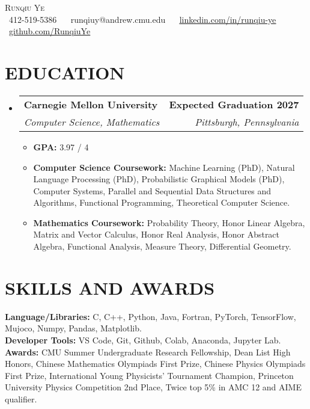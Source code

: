 \documentclass[letterpaper,11pt]{article}
\makeatletter
\newcommand{\resumeItem}[1]{
  \item\small{
    {#1 \vspace{-2pt}}
  }
}
\newcommand{\resumeSubheading}[4]{
  \vspace{-2pt}\item
    \begin{tabular*}{1.0\textwidth}[t]{l@{\extracolsep{\fill}}r}
      {#1} & \textbf{\small #2} \\
      \textit{\small#3} & \textit{\small #4} \\
    \end{tabular*}\vspace{-7pt}
}
\newcommand{\resumeSubHeadingListStart}{\begin{itemize}[leftmargin=0.0in, label={}]}
\newcommand{\resumeSubHeadingListEnd}{\end{itemize}}
\newcommand{\resumeItemListStart}{\begin{itemize}[leftmargin=0.15in]}
\newcommand{\resumeItemListEnd}{\end{itemize}\vspace{-5pt}}
\makeatother
\begin{document}

\begin{center}
    {\Huge \scshape Runqiu Ye} \\ \vspace{5pt}
    \small \raisebox{-0.1\height}\faPhone\ 412-519-5386 ~ 
    {\raisebox{-0.1\height}\faEnvelope\ 
    {runqiuy@andrew.cmu.edu}} ~ 
    {\raisebox{-0.1\height}\faLinkedin\ 
    \href{https://www.linkedin.com/in/runqiu-ye/}
    {\underline{linkedin.com/in/runqiu-ye}}}  ~
    {\raisebox{-0.1\height}\faGithub\ 
    \href{https://github.com/RunqiuYe}
    {\underline{github.com/RunqiuYe}}}
\end{center}
\vspace{-5pt}


\section{EDUCATION}
\resumeSubHeadingListStart
\resumeSubheading
  {\textbf{Carnegie Mellon University}}{Expected Graduation 2027}
  {Computer Science, Mathematics}
  {Pittsburgh, Pennsylvania}
\resumeItemListStart
\resumeItem{\textbf{GPA:} 3.97 / 4}
\resumeItem{\textbf{Computer Science Coursework:} 
Machine Learning (PhD), 
Natural Language Processing (PhD), 
Probabilistic Graphical Models (PhD), 
Computer Systems, 
Parallel and Sequential Data Structures and Algorithms,
Functional Programming, 
Theoretical Computer Science.}
\resumeItem{\textbf{Mathematics Coursework:} 
Probability Theory, 
Honor Linear Algebra, 
Matrix and Vector Calculus, 
Honor Real Analysis, 
Honor Abstract Algebra, 
Functional Analysis, 
Measure Theory, 
Differential Geometry.}
\resumeItemListEnd
\resumeSubHeadingListEnd

\vspace{-10pt}

\section{SKILLS AND AWARDS}
\begin{itemize}[leftmargin=0in, label={}]
  \small{\item{
   \textbf{Language/Libraries:} 
   C, 
   C++, 
   Python, 
   Java, 
   Fortran, 
   PyTorch, 
   TensorFlow, 
   Mujoco, 
   Numpy, 
   Pandas, 
   Matplotlib. \\
   \textbf{Developer Tools:} 
   VS Code, 
   Git, 
   Github, 
   Colab, 
   Anaconda, 
   Jupyter Lab. \\
   \textbf{Awards:} 
   CMU Summer Undergraduate Research Fellowship, 
   Dean List High Honors, 
   Chinese Mathematics Olympiads First Prize,
   Chinese Physics Olympiads First Prize,
   International Young Physicists' Tournament Champion, 
   Princeton University Physics Competition 2nd Place, 
   Twice top 5\% in AMC 12 and AIME qualifier.
  }}
\end{itemize}
\vspace{-16pt}
\end{document}
